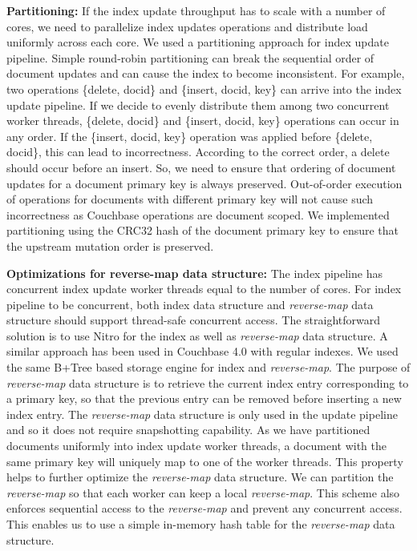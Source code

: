\documentclass{vldb}
\begin{document}
\textbf{Partitioning:} If the index update throughput has to scale with a number of cores, we need to parallelize index updates operations and distribute load uniformly across each core. We used a partitioning approach for index update pipeline. Simple round-robin partitioning can break the sequential order of document updates and can cause the index to become inconsistent. For example, two operations \{delete, docid\} and \{insert, docid, key\} can arrive into the index update pipeline. If we decide to evenly distribute them among two concurrent worker threads, \{delete, docid\} and \{insert, docid, key\} operations can occur in any order. If the \{insert, docid, key\} operation was applied before \{delete, docid\}, this can lead to incorrectness. According to the correct order, a delete should occur before an insert. So, we need to ensure that ordering of document updates for a document primary key is always preserved. Out-of-order execution of operations for documents with different primary key will not cause such incorrectness as Couchbase operations are document scoped. We implemented partitioning using the CRC32 hash of the document primary key to ensure that the upstream mutation order is preserved.

\textbf{Optimizations for reverse-map data structure:} The index pipeline has concurrent index update worker threads equal to the number of cores. For index pipeline to be concurrent, both index data structure and \textit{reverse-map} data structure should support thread-safe concurrent access. The straightforward solution is to use Nitro for the index as well as \textit{reverse-map} data structure. A similar approach has been used in Couchbase 4.0 with regular indexes. We used the same B+Tree based storage engine for index and \textit{reverse-map}. The purpose of \textit{reverse-map} data structure is to retrieve the current index entry corresponding to a primary key, so that the previous entry can be removed before inserting a new index entry. The \textit{reverse-map} data structure is only used in the update pipeline and so it does not require snapshotting capability. As we have partitioned documents uniformly into index update worker threads, a document with the same primary key will uniquely map to one of the worker threads. This property helps to further optimize the \textit{reverse-map} data structure. We can partition the \textit{reverse-map} so that each worker can keep a local \textit{reverse-map}. This scheme also enforces sequential access to the \textit{reverse-map} and prevent any concurrent access. This enables us to use a simple in-memory hash table for the \textit{reverse-map} data structure.
\end{document}
